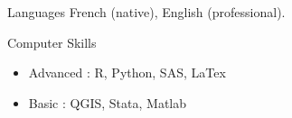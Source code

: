 \documentclass{resume} %
\begin{document}
\newpage
\begin{rSection}{Languages}
French (native), English (professional).
\vspace*{5mm}
\end{rSection}
\begin{rSection}{Computer Skills}
\begin{itemize}
	\item Advanced : R, Python, SAS, LaTex 
	\item Basic : QGIS, Stata, Matlab 
\end{itemize}
\end{rSection}
\end{document}
